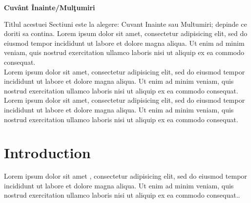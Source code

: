 \documentclass[12pt,openright,twoside]{book}
\begin{document}
\begin{center}

{\LARGE \textbf{Cuv\^ant \^Inainte/Mul\c{t}umiri}}

\end{center}

\vspace{36pt}
Titlul acestuei Sectiuni este la alegere: Cuvant Inainte sau Multumiri; depinde ce doriti sa contina. Lorem ipsum dolor sit amet, consectetur adipisicing elit, sed do eiusmod tempor incididunt ut labore et dolore magna aliqua. Ut enim ad minim veniam, quis nostrud exercitation ullamco laboris nisi ut aliquip ex ea commodo consequat.\\

Lorem ipsum dolor sit amet, consectetur adipisicing elit, sed do eiusmod tempor incididunt ut labore et dolore magna aliqua. Ut enim ad minim veniam, quis nostrud exercitation ullamco laboris nisi ut aliquip ex ea commodo consequat.\\

Lorem ipsum dolor sit amet, consectetur adipisicing elit, sed do eiusmod tempor incididunt ut labore et dolore magna aliqua. Ut enim ad minim veniam, quis nostrud exercitation ullamco laboris nisi ut aliquip ex ea commodo consequat.\\

\vspace{40pt}



\vspace*{\fill}
\newpage
\thispagestyle{empty} \vspace*{\fill} \tableofcontents

\setlength\parindent{0pt}



\setcounter{page}{0}


\newpage



\chapter{Introduction}
\label{intro}

Lorem ipsum\cite{book1} dolor sit amet \cite{book1,art1},  consectetur adipisicing elit, sed do eiusmod tempor incididunt ut labore et dolore magna aliqua. Ut enim ad minim veniam, quis nostrud exercitation ullamco laboris nisi ut aliquip ex ea commodo consequat..\\
\end{document}
